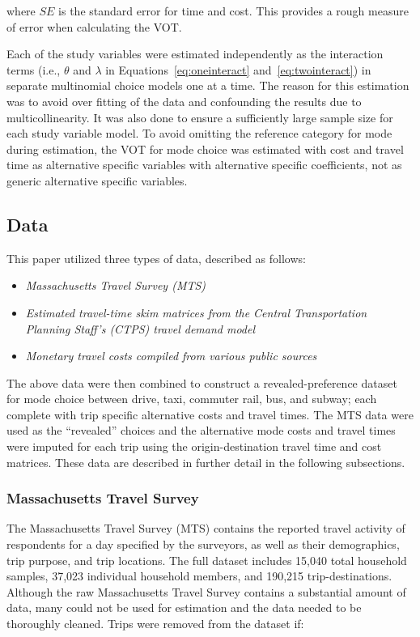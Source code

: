 \documentclass[numbered]{trbunofficial}\usepackage[]{graphicx}\usepackage[]{color}
\begin{document}
\noindent where $SE$ is the standard error for time and cost. This provides a rough measure of error when calculating the VOT. 

Each of the study variables were estimated independently as the interaction terms (i.e., $\theta$ and $\lambda$ in Equations~\eqref{eq:oneinteract} and~\eqref{eq:twointeract}) in separate multinomial choice models one at a time. The reason for this estimation was to avoid over fitting of the data and confounding the results due to multicollinearity. It was also done to ensure a sufficiently large sample size for each study variable model. To avoid omitting the reference category for mode during estimation, the VOT for mode choice was estimated with cost and travel time as alternative specific variables with alternative specific coefficients, not as generic alternative specific variables.

\subsection{Data}\label{sec:data}
This paper utilized three types of data, described as follows:

\begin{itemize}[leftmargin=0.25in, topsep=3pt, itemsep=1pt, parsep=1pt]
\item \emph{Massachusetts Travel Survey (MTS)}
\item \emph{Estimated travel-time skim matrices from the Central Transportation Planning Staff's (CTPS) travel demand model}
\item \emph{Monetary travel costs compiled from various public sources} 
\end{itemize}

\noindent The above data were then combined to construct a revealed-preference dataset for mode choice between drive, taxi, commuter rail, bus, and subway; each complete with trip specific alternative costs and travel times. The MTS data were used as the ``revealed'' choices and the alternative mode costs and travel times were imputed for each trip using the origin-destination travel time and cost matrices. These data are described in further detail in the following subsections.

\subsubsection{Massachusetts Travel Survey}
The Massachusetts Travel Survey (MTS) \citep{MTS2012} contains the reported travel activity of respondents for a day specified by the surveyors, as well as their demographics, trip purpose, and trip locations. The full dataset includes 15,040 total household samples, 37,023 individual household members, and 190,215 trip-destinations. Although the raw Massachusetts Travel Survey contains a substantial amount of data, many could not be used for estimation and the data needed to be thoroughly cleaned. Trips were removed from the dataset if:
\end{document}
